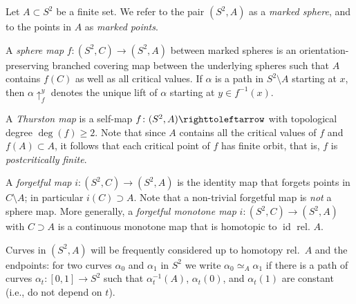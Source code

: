 \documentclass{amsart}
\theoremstyle{plain}
\theoremstyle{definition}
\theoremstyle{remark}
\newcommand{\id}{\operatorname{id}}
\newcommand\lift[2]{{\uparrow}_{#1}^{#2}}
\newcommand\selfmap{\righttoleftarrow}
\begin{document}




Let $A\subset S^2$ be a finite set.  We refer to the pair $(S^2, A)$ as a \emph{marked sphere}, and to the points in $A$ as \emph{marked points}. 

A \emph{sphere map} $f\colon (S^2,C) \to (S^2,A)$ between marked spheres is an orientation-preserving branched covering map between the underlying spheres such that $A$ contains $f(C)$ as well as all critical values. If $\alpha$ is a path in $S^2\setminus A$ starting at $x$, then $\alpha\lift{f}{y}$ denotes the unique lift of $\alpha$ starting at $y\in f^{-1}(x)$.

A \emph{Thurston map} is a self-map $f\colon (S^2,A)\selfmap$ with topological degree $\deg(f)\geq 2$. Note that since $A$ contains all the critical values of $f$ and $f(A)\subset A$,  it follows that each critical point of $f$ has finite orbit, that is, $f$ is \emph{postcritically finite}.


A \emph{forgetful map} $i\colon (S^2,C)\to (S^2,A)$ is the identity map that forgets points in $C\setminus A$; in particular $i(C)\supset A$. Note that a non-trivial forgetful map is \emph{not} a sphere map. More generally, a \emph{forgetful monotone map} $i\colon (S^2,C)\to (S^2,A)$ with $C\supset A$ is a continuous monotone map that is homotopic to $\id$ rel. $A$. 

Curves in $(S^2,A)$ will be frequently considered up to homotopy rel.\ $A$ and the endpoints: for two curves $\alpha_0$ and $\alpha_1$ in $S^2$ we write $\alpha_0\simeq_A \alpha_1$ if there is a path of curves $\alpha_t\colon [0,1]\to S^2$ such that $\alpha^{-1}_t(A)$, $\alpha_t(0)$, and $\alpha_t(1)$ are constant (i.e., do not depend on $t$).
\end{document}
